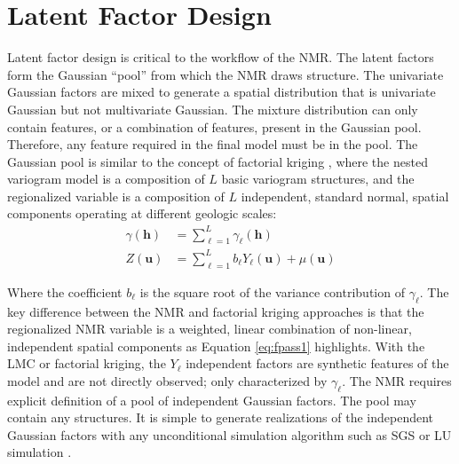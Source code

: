 
\FloatBarrier
\section{Latent Factor Design}
\label{sec:04factord}

Latent factor design is critical to the workflow of the \gls{NMR}. The latent factors form the Gaussian ``pool'' from which the \gls{NMR} draws structure. The univariate Gaussian factors are mixed to generate a spatial distribution that is univariate Gaussian but not multivariate Gaussian. The mixture distribution can only contain features, or a combination of features, present in the Gaussian pool. Therefore, any feature required in the final model must be in the pool. The Gaussian pool is similar to the concept of factorial kriging \citep{goovaerts1997geostatistics}, where the nested variogram model is a composition of $L$ basic variogram structures, and the regionalized variable is a composition of $L$ independent, standard normal, spatial components operating at different geologic scales:
\begin{align}
    \label{eq:gamma_comp}
    \gamma(\mathbf{h}) & = \sum_{\ell=1}^{L} \gamma_{\ell}(\mathbf{h})                     \\
    \label{eq:z_comp}
    Z(\mathbf{u})      & = \sum_{\ell=1}^{L}b_{\ell}Y_{\ell}(\mathbf{u}) + \mu(\mathbf{u})
\end{align}

Where the coefficient $b_{\ell}$ is the square root of the variance contribution of $\gamma_{\ell}$. The key difference between the \gls{NMR} and factorial kriging approaches is that the regionalized \gls{NMR} variable is a weighted, linear combination of non-linear, independent spatial components as Equation \ref{eq:fpass1} highlights. With the \gls{LMC} or factorial kriging, the $Y_{\ell}$ independent factors are synthetic features of the model and are not directly observed; only characterized by $\gamma_{\ell}$. The \gls{NMR} requires explicit definition of a pool of independent Gaussian factors. The pool may contain any structures. It is simple to generate realizations of the independent Gaussian factors with any unconditional simulation algorithm such as \gls{SGS} \citep{gomez-hernandez1993joint} or LU simulation \citep{davis1987production}.

